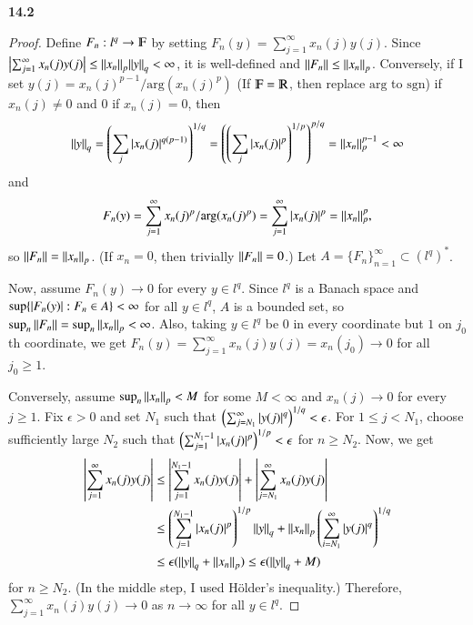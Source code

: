 \documentclass[a4paper, 12pt]{article}
\theoremstyle{Mydefinition}
\theoremstyle{Mytheorem}
\begin{document}
\noindent \textbf{14.2}
\begin{proof}
Define $F_n:l^q\rightarrow \varmathbb{F}$ by setting $F_n(y) = \sum_{j=1}^\infty x_n(j)y(j)$. Since $\abs{\sum_{j=1}^\infty x_n(j)y(j)}\leq \norm{x_n}_p\norm{y}_q<\infty$, it is well-defined and $\norm{F_n}\leq \norm{x_n}_p$. Conversely, if I set $y(j) = x_n(j)^{p-1}/\textrm{arg}(x_n(j)^p)$ (If $\varmathbb{F}=\varmathbb{R}$, then replace $\textrm{arg}$ to $\textrm{sgn}$) if $x_n(j)\neq 0$ and $0$ if $x_n(j) = 0$, then
\begin{equation}
    \norm{y}_q = \left(\sum_j \abs{x_n(j)}^{q(p-1)}\right)^{1/q} = \left(\left(\sum_j \abs{x_n(j)}^{p}\right)^{1/p}\right)^{p/q} = \norm{x_n}_p^{p-1}<\infty
\end{equation}
and
\begin{equation}
    F_n(y) = \sum_{j=1}^\infty x_n(j)^p/\textrm{arg}(x_n(j)^p) = \sum_{j=1}^\infty \abs{x_n(j)}^p = \norm{x_n}_p^p,
\end{equation}
so $\norm{F_n} = \norm{x_n}_p$. (If $x_n = 0$, then trivially $\norm{F_n} = 0$.) Let $A=\{F_n\}_{n=1}^\infty \subset (l^q)^*$.

Now, assume $F_n(y)\rightarrow 0$ for every $y\in l^q$. Since $l^q$ is a Banach space and $\sup\{\abs{F_n(y)}:F_n\in A\}<\infty$ for all $y\in l^q$, $A$ is a bounded set, so $\sup_n \norm{F_n} = \sup_n \norm{x_n}_p<\infty$. Also, taking $y\in l^q$ be $0$ in every coordinate but $1$ on $j_0$th coordinate, we get $F_n(y) = \sum_{j=1}^\infty x_n(j)y(j) = x_n(j_0)\rightarrow 0$ for all $j_0\geq 1$.

Conversely, assume $\sup_n\norm{x_n}_p<M$ for some $M<\infty$ and $x_n(j)\rightarrow 0$ for every $j\geq 1$. Fix $\epsilon>0$ and set $N_1$ such that $\left(\sum_{j=N_1}^\infty \abs{y(j)}^q\right)^{1/q}<\epsilon$. For $1\leq j< N_1$, choose sufficiently large $N_2$ such that $\left(\sum_{j=1}^{N_1-1} \abs{x_n(j)}^p\right)^{1/p}<\epsilon$ for $n\geq N_2$. Now, we get
\begin{equation}
\begin{split}
    \abs{\sum_{j=1}^\infty x_n(j)y(j)} &\leq \abs{\sum_{j=1}^{N_1-1} x_n(j)y(j)} + \abs{\sum_{j=N_1}^\infty x_n(j)y(j)}\\
    &\leq \left(\sum_{j=1}^{N_1-1} \abs{x_n(j)}^p\right)^{1/p}\norm{y}_q + \norm{x_n}_p\left(\sum_{i=N_1}^\infty \abs{y(j)}^q\right)^{1/q}\\
    &\leq \epsilon(\norm{y}_q+\norm{x_n}_p)\leq\epsilon(\norm{y}_q+M)
\end{split}
\end{equation}
for $n\geq N_2$. (In the middle step, I used H\"older's inequality.) Therefore, $\sum_{j=1}^\infty x_n(j)y(j)\rightarrow 0$ as $n\rightarrow \infty$ for all $y\in l^q$.
\end{proof}
\end{document}
